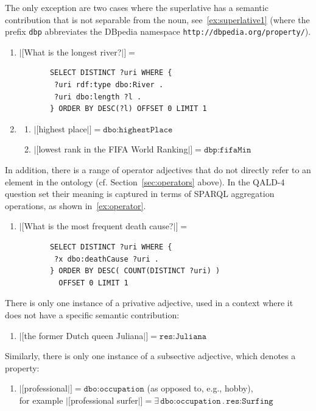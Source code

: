 \documentclass[11pt]{article}
\begin{document}
The only exception are two cases where the superlative has a semantic contribution that is not separable from the noun, 
see~\ref{ex:superlative1} (where the prefix \texttt{dbp} abbreviates the DBpedia namespace \texttt{http://dbpedia.org/property/}).
\begin{enumerate}[resume]
\item $|[$What is the longest river?$|]=$
       \begin{verbatim}
       SELECT DISTINCT ?uri WHERE { 
        ?uri rdf:type dbo:River . 
        ?uri dbo:length ?l . 
       } ORDER BY DESC(?l) OFFSET 0 LIMIT 1 
       \end{verbatim}
\label{ex:superlative2}
\item \begin{enumerate}
\item $|[$highest place$|]=\texttt{dbo:highestPlace}$
\item $|[$lowest rank in the FIFA World Ranking$|]=\texttt{dbp:fifaMin}$
\end{enumerate}
\label{ex:superlative1}
\end{enumerate}

In addition, there is a range of operator adjectives that do not directly refer to an element in the ontology 
(cf. Section~\ref{sec:operators} above). In the QALD-4 question set their meaning is captured in terms 
of SPARQL aggregation operations, as shown in~\ref{ex:operator}. 
\begin{enumerate}[resume]
\item $|[$What is the most frequent death cause?$|]=$
       \begin{verbatim}
       SELECT DISTINCT ?uri WHERE {
        ?x dbo:deathCause ?uri . 
       } ORDER BY DESC( COUNT(DISTINCT ?uri) ) 
         OFFSET 0 LIMIT 1
       \end{verbatim}
       \label{ex:operator1}
\end{enumerate}

There is only one instance of a privative adjective, used in a context where it does not have a specific semantic contribution:
\begin{enumerate}[resume]
\item $|[$the former Dutch queen Juliana$|]=\texttt{res:Juliana}$
\end{enumerate}

Similarly, there is only one instance of a subsective adjective, which denotes a property:
\begin{enumerate}[resume]
\item $|[$professional$|]=\texttt{dbo:occupation}$ (as opposed to, e.g., hobby),\\
       for example $|[$professional surfer$|]=\exists\,\texttt{dbo:occupation}\,.\,\texttt{res:Surfing}$
\end{enumerate}
\end{document}

